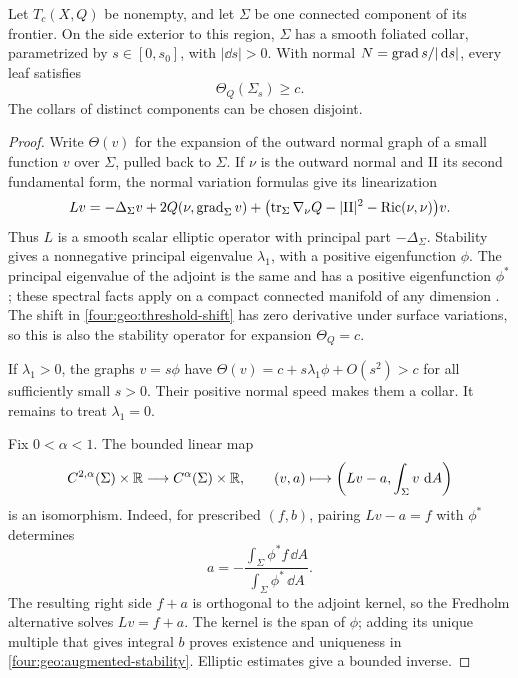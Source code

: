 \begin{lemma}\label{four:geo:stable-collar}
Let $T_c(X,Q)$ be nonempty, and let $\Sigma$ be one connected component of
its frontier.  On the side exterior to this region, $\Sigma$ has a smooth
foliated collar, parametrized by $s\in[0,s_0]$, with $|\dd s|>0$.  With
normal $N=\operatorname{grad} s/|\,\mathrm d s|$, every leaf satisfies
\begin{equation}\label{four:geo:collar-expansion}
 \Theta_Q(\Sigma_s)\ge c.
\end{equation}
The collars of distinct components can be chosen disjoint.
\end{lemma}

\begin{proof}
Write $\Theta(v)$ for the expansion of the outward normal graph of a small
function $v$ over $\Sigma$, pulled back to $\Sigma$.  If $\nu$ is the
outward normal and $\mathrm{II}$ its second fundamental form, the normal
variation formulas give its linearization
\[
 Lv=-\Delta_\Sigma v+2Q(\nu,\operatorname{grad}_\Sigma v)
   +\bigl(\operatorname{tr}_\Sigma\nabla_\nu Q-|\mathrm{II}|^2
                          -\operatorname{Ric}(\nu,\nu)\bigr)v.
\]
Thus $L$ is a smooth scalar elliptic operator with principal part
$-\Delta_\Sigma$.  Stability gives a nonnegative principal eigenvalue
$\lambda_1$, with a positive eigenfunction $\phi$.  The principal
eigenvalue of the adjoint is the same and has a positive eigenfunction
$\phi^*$; these spectral facts apply on a compact connected manifold of
any dimension \cite[Lemma~4.1]{AnderssonMarsSimon2008}.  The shift in
\eqref{four:geo:threshold-shift} has zero derivative under surface variations,
so this is also the stability operator for expansion $\Theta_Q=c$.

If $\lambda_1>0$, the graphs $v=s\phi$ have
$\Theta(v)=c+s\lambda_1\phi+O(s^2)>c$ for all sufficiently small $s>0$.
Their positive normal speed makes them a collar.  It remains to treat
$\lambda_1=0$.

Fix $0<\alpha<1$.  The bounded linear map
\begin{equation}\label{four:geo:augmented-stability}
 C^{2,\alpha}(\Sigma)\times\mathbb R\longrightarrow C^\alpha(\Sigma)\times\mathbb R,
 \qquad (v,a)\longmapsto
 \left(Lv-a,\int_\Sigma v\,\,\mathrm d A\right)
\end{equation}
is an isomorphism.  Indeed, for prescribed $(f,b)$, pairing $Lv-a=f$
with $\phi^*$ determines
\[
 a=-\frac{\int_\Sigma\phi^*f\,\dd A}
          {\int_\Sigma\phi^*\,\dd A}.
\]
The resulting right side $f+a$ is orthogonal to the adjoint kernel, so the
Fredholm alternative solves $Lv=f+a$.  The kernel is the span of $\phi$;
adding its unique multiple that gives integral $b$ proves existence and
uniqueness in \eqref{four:geo:augmented-stability}.  Elliptic estimates give a
bounded inverse.


\end{proof}
